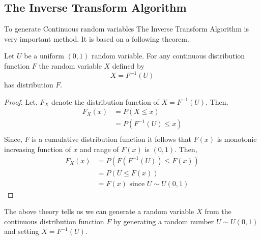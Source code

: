 \subsection{The Inverse Transform Algorithm}
To generate Continuous random variables The Inverse Transform Algorithm is very important method. It is based on a following theorem.
\begin{theorem}
    \label{ITA theorem}
    Let $U$ be a uniform  $(0,1)$ random variable. For any continuous distribution function  $F$ the random variable  $X$ defined by 
    \[
    X=F^{-1}(U)
    \] 
    has distribution $F$.
\end{theorem}
\begin{proof}
    Let, $F_X$ denote the distribution function of  $X=F^{-1}(U)$. Then,
    \begin{align*}
        F_X(x) &= P(X\le x)\\ 
               &= P(F^{-1}(U)\le x) \\ 
    \end{align*}
    Since, $F$ is a cumulative distribution function it follows that $F(x)$ is monotonic increasing function of  $x$ and range of  $F(x)$ is  $(0,1)$.
    Then,
    \begin{align*}
        F_X(x) &= P\left(F\left(F^{-1}(U)\right)\le F(x)\right) \\ 
               &= P(U\le F(x))\\ 
               &= F(x) \text{ since $U\sim U(0,1)$ }
    \end{align*}
\end{proof}

The above theory tells us we can generate a random variable $X$ from the continuous distribution function  $F$ by generating a random number $U\sim U(0,1)$ 
and setting $X=F^{-1}(U)$.

